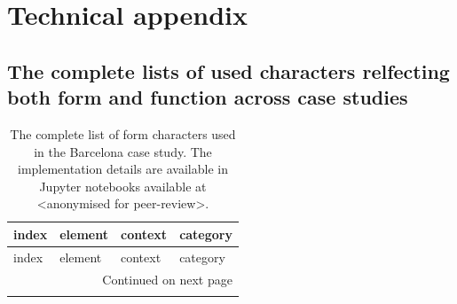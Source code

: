 \appendix
\section{Technical appendix}
\label{sec:appendix}

\subsection{The complete lists of used characters relfecting both form and function across case studies}

\small
\begin{longtable}{p{5cm}p{4cm}p{4cm}l}
\caption{The complete list of form characters used in the Barcelona case study. The implementation details are available
in Jupyter notebooks available at <anonymised for peer-review>.}
\label{tab:form_bcn} \\
\toprule
                                   index &                         element &                    context &     category \\
\midrule
\endfirsthead

\toprule
                               index &                         element &                    context &     category \\
\midrule
\endhead
\midrule
\multicolumn{4}{r}{{Continued on next page}} \\
\midrule
\endfoot


\end{longtable}

